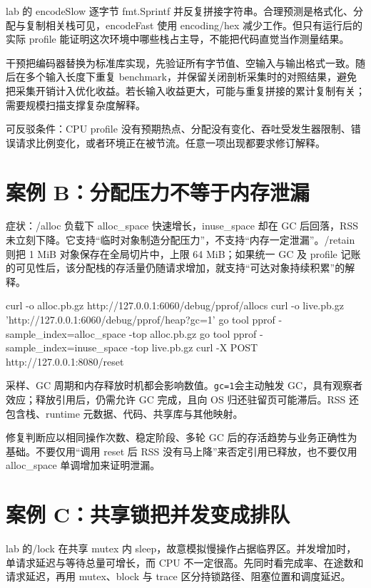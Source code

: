 \documentclass[UTF8,fontset=fandol,openany,11pt]{ctexbook}
\begin{document}
lab 的 encodeSlow 逐字节 fmt.Sprintf 并反复拼接字符串。合理预测是格式化、分配与复制相关栈可见，encodeFast 使用 encoding/hex 减少工作。但只有运行后的实际 profile 能证明这次环境中哪些栈占主导，不能把代码直觉当作测量结果。

干预把编码器替换为标准库实现，先验证所有字节值、空输入与输出格式一致。随后在多个输入长度下重复 benchmark，并保留关闭剖析采集时的对照结果，避免把采集开销计入优化收益。若长输入收益更大，可能与重复拼接的累计复制有关；需要规模扫描支撑复杂度解释。

可反驳条件：CPU profile 没有预期热点、分配没有变化、吞吐受发生器限制、错误请求比例变化，或者环境正在被节流。任意一项出现都要求修订解释。

\section{案例 B：分配压力不等于内存泄漏}
症状：/alloc 负载下 alloc\_space 快速增长，inuse\_space 却在 GC 后回落，RSS 未立刻下降。它支持“临时对象制造分配压力”，不支持“内存一定泄漏”。/retain 则把 1 MiB 对象保存在全局切片中，上限 64 MiB；如果统一 GC 及 profile 记账的可见性后，该分配栈的存活量仍随请求增加，就支持“可达对象持续积累”的解释。

\begin{codeblock}
curl -o alloc.pb.gz http://127.0.0.1:6060/debug/pprof/allocs
curl -o live.pb.gz 'http://127.0.0.1:6060/debug/pprof/heap?gc=1'
go tool pprof -sample_index=alloc_space -top alloc.pb.gz
go tool pprof -sample_index=inuse_space -top live.pb.gz
curl -X POST http://127.0.0.1:8080/reset
\end{codeblock}

采样、GC 周期和内存释放时机都会影响数值。\texttt{gc=1}会主动触发 GC，具有观察者效应；释放引用后，仍需允许 GC 完成，且向 OS 归还驻留页可能滞后。RSS 还包含栈、runtime 元数据、代码、共享库与其他映射。

修复判断应以相同操作次数、稳定阶段、多轮 GC 后的存活趋势与业务正确性为基础。不要仅用“调用 reset 后 RSS 没有马上降”来否定引用已释放，也不要仅用 alloc\_space 单调增加来证明泄漏。

\section{案例 C：共享锁把并发变成排队}
lab 的/lock 在共享 mutex 内 sleep，故意模拟慢操作占据临界区。并发增加时，单请求延迟与等待总量可增长，而 CPU 不一定很高。先同时看完成率、在途数和请求延迟，再用 mutex、block 与 trace 区分持锁路径、阻塞位置和调度延迟。
\end{document}
